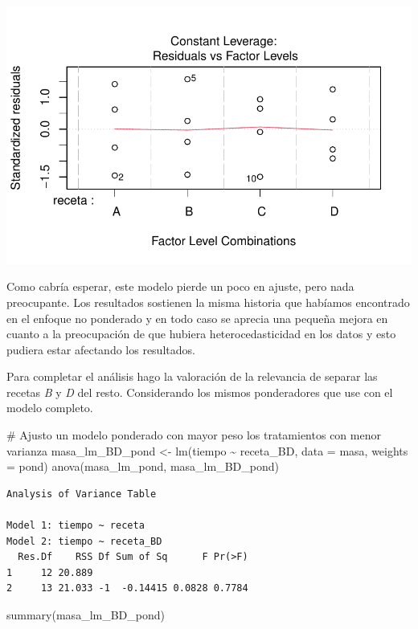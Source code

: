 \documentclass[
  letterpaper,
  DIV=11,
  numbers=noendperiod]{scrartcl}
\newenvironment{Shaded}{\begin{snugshade}}{\end{snugshade}}
\newcommand{\AttributeTok}[1]{\textcolor[rgb]{0.40,0.45,0.13}{#1}}
\newcommand{\CommentTok}[1]{\textcolor[rgb]{0.37,0.37,0.37}{#1}}
\newcommand{\FunctionTok}[1]{\textcolor[rgb]{0.28,0.35,0.67}{#1}}
\newcommand{\NormalTok}[1]{\textcolor[rgb]{0.00,0.23,0.31}{#1}}
\newcommand{\OtherTok}[1]{\textcolor[rgb]{0.00,0.23,0.31}{#1}}
\newcommand{\SpecialCharTok}[1]{\textcolor[rgb]{0.37,0.37,0.37}{#1}}
\begin{document}
\includegraphics{solucion-masa-pizza_files/figure-pdf/modelo-pond-4.pdf}

Como cabría esperar, este modelo pierde un poco en ajuste, pero nada
preocupante. Los resultados sostienen la misma historia que habíamos
encontrado en el enfoque no ponderado y en todo caso se aprecia una
pequeña mejora en cuanto a la preocupación de que hubiera
heterocedasticidad en los datos y esto pudiera estar afectando los
resultados.

Para completar el análisis hago la valoración de la relevancia de
separar las recetas \emph{B} y \emph{D} del resto. Considerando los
mismos ponderadores que use con el modelo completo.

\begin{Shaded}
\begin{Highlighting}[]
\CommentTok{\# Ajusto un modelo ponderado con mayor peso los tratamientos con menor varianza}
\NormalTok{masa\_lm\_BD\_pond }\OtherTok{\textless{}{-}} \FunctionTok{lm}\NormalTok{(tiempo }\SpecialCharTok{\textasciitilde{}}\NormalTok{ receta\_BD, }\AttributeTok{data =}\NormalTok{ masa, }\AttributeTok{weights =}\NormalTok{ pond)}
\FunctionTok{anova}\NormalTok{(masa\_lm\_pond, masa\_lm\_BD\_pond)}
\end{Highlighting}
\end{Shaded}

\begin{verbatim}
Analysis of Variance Table

Model 1: tiempo ~ receta
Model 2: tiempo ~ receta_BD
  Res.Df    RSS Df Sum of Sq      F Pr(>F)
1     12 20.889                           
2     13 21.033 -1  -0.14415 0.0828 0.7784
\end{verbatim}

\begin{Shaded}
\begin{Highlighting}[]
\FunctionTok{summary}\NormalTok{(masa\_lm\_BD\_pond)}
\end{Highlighting}
\end{Shaded}
\end{document}

